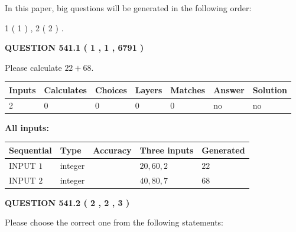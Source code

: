 \documentclass[12pt]{article}
\begin{document}
\vspace{0.2in}
   
In this paper, big questions will be generated in the following order: 
   
   
   1 ( 1 )
 ,
   2 ( 2 )
 .
  
\vspace{0.2in}
  
{\textbf{\Large{QUESTION
541.1 
 ( 1 , 1 , 6791 )
}}}
  
  
 
Please calculate $ %
22 +  %
68 $.
 
 
   
   
   
   
\noindent\begin{tabular}{|l|l|l|l|l|l|l|}
 \hline
Inputs & Calculates & Choices & Layers & Matches & Answer & Solution \\ \hline
 2  & 
 0  & 
 0
  & 
 0  & 
 0  & 
  no & 
  no 
  \\ \hline
 \end{tabular}
   
   
   
   
\noindent{}
   
   
   
   
\noindent\vspace{0.1in}\hspace{-0.08in} {\textbf{\Large{All inputs: }}}
   
   
  
  
\noindent\begin{tabular}{|l|l|l|l|l|}
\hline
 Sequential & Type & Accuracy & Three inputs & Generated \\ 
\hline
 
 
  INPUT $  1 $ & integer &  & $
 20
 , 
 60
 , 
 2
 $ & $ 22 $ 
 \\  \hline  
 
 
  INPUT $  2 $ & integer &  & $
 40
 , 
 80
 , 
 7
 $ & $ 68 $ 
 \\  \hline  
 \end{tabular}
   
   
  
\vspace{0.2in}
  
{\textbf{\Large{QUESTION
541.2 
 ( 2 , 2 , 3 )
}}}
  
  
Please choose the correct one from the following statements:
 
\end{document}
